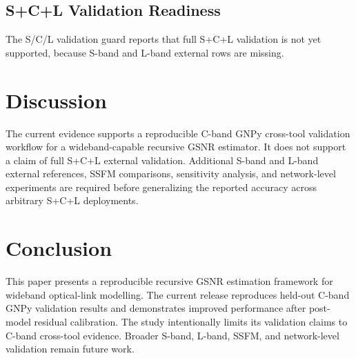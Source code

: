 \documentclass[twocolumn]{article}
\begin{document}
\subsection{S+C+L Validation Readiness}
The S/C/L validation guard reports that full S+C+L validation is not yet supported, because S-band and L-band external rows are missing.

\section{Discussion}
The current evidence supports a reproducible C-band GNPy cross-tool validation workflow for a wideband-capable recursive GSNR estimator. It does not support a claim of full S+C+L external validation. Additional S-band and L-band external references, SSFM comparisons, sensitivity analysis, and network-level experiments are required before generalizing the reported accuracy across arbitrary S+C+L deployments.

\section{Conclusion}
This paper presents a reproducible recursive GSNR estimation framework for wideband optical-link modelling. The current release reproduces held-out C-band GNPy validation results and demonstrates improved performance after post-model residual calibration. The study intentionally limits its validation claims to C-band cross-tool evidence. Broader S-band, L-band, SSFM, and network-level validation remain future work.



\end{document}
